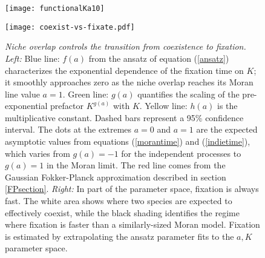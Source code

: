 

\begin{figure}[h]
	\centering
	\begin{minipage}{0.59\linewidth}
		\centering
		\texttt{[image: functionalKa10]}%
	\end{minipage}
	\begin{minipage}{0.39\linewidth}
		\centering
		\texttt{[image: coexist-vs-fixate.pdf]}
	\end{minipage}
	\caption{\emph{Niche overlap controls the transition from coexistence to fixation.}
		\emph{Left:} Blue line: $f(a)$ from the ansatz of equation (\ref{ansatz}) characterizes the exponential dependence of the fixation time on $K$; it  smoothly approaches zero as the niche overlap reaches its Moran line value $a=1$. Green line: $g(a)$ quantifies the scaling of the pre-exponential prefactor $K^{g(a)}$ with $K$. Yellow line: $h(a)$ is the multiplicative constant. Dashed bars represent a 95\% confidence interval. The dots at the extremes $a=0$ and $a=1$ are the expected asymptotic values from equations (\ref{morantime}) and (\ref{indietime}), which varies from $g(a)=-1$ for the independent processes to $g(a)=1$ in the Moran limit. The red line comes from the Gaussian Fokker-Planck approximation described in section \ref{FPsection}. 
		\emph{Right:} In part of the parameter space, fixation is always fast. The white area shows where two species are expected to effectively coexist, while the black shading identifies the regime where fixation is faster than a similarly-sized Moran model. Fixation is estimated by extrapolating the ansatz parameter fits to the $a,K$ parameter space. %
	} \label{ansatzplot}
\end{figure}


